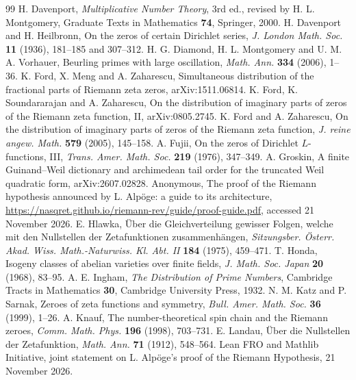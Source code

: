 \documentclass[11pt,a4paper]{article}
\theoremstyle{definition}\newtheorem{definition}[proposition]{Definition}
\theoremstyle{remark}\newtheorem{remark}[proposition]{Remark}
\begin{document}
\begin{thebibliography}{99}
 H. Davenport, \emph{Multiplicative Number Theory}, 3rd ed., revised by H. L. Montgomery, Graduate Texts in Mathematics \textbf{74}, Springer, 2000.
 H. Davenport and H. Heilbronn, On the zeros of certain Dirichlet series, \emph{J. London Math. Soc.} \textbf{11} (1936), 181--185 and 307--312.
 H. G. Diamond, H. L. Montgomery and U. M. A. Vorhauer, Beurling primes with large oscillation, \emph{Math. Ann.} \textbf{334} (2006), 1--36.
 K. Ford, X. Meng and A. Zaharescu, Simultaneous distribution of the fractional parts of Riemann zeta zeros, arXiv:1511.06814.
 K. Ford, K. Soundararajan and A. Zaharescu, On the distribution of imaginary parts of zeros of the Riemann zeta function, II, arXiv:0805.2745.
 K. Ford and A. Zaharescu, On the distribution of imaginary parts of zeros of the Riemann zeta function, \emph{J. reine angew. Math.} \textbf{579} (2005), 145--158.
 A. Fujii, On the zeros of Dirichlet $L$-functions, III, \emph{Trans. Amer. Math. Soc.} \textbf{219} (1976), 347--349.
 A. Groskin, A finite Guinand--Weil dictionary and archimedean tail order for the truncated Weil quadratic form, arXiv:2607.02828.
 Anonymous, The proof of the Riemann hypothesis announced by L. Alp\"oge: a guide to its architecture, \url{https://nasqret.github.io/riemann-rev/guide/proof-guide.pdf}, accessed 21 November 2026.
 E. Hlawka, \"Uber die Gleichverteilung gewisser Folgen, welche mit den Nullstellen der Zetafunktionen zusammenh\"angen, \emph{Sitzungsber. \"Osterr. Akad. Wiss. Math.-Naturwiss. Kl. Abt. II} \textbf{184} (1975), 459--471.
 T. Honda, Isogeny classes of abelian varieties over finite fields, \emph{J. Math. Soc. Japan} \textbf{20} (1968), 83--95.
 A. E. Ingham, \emph{The Distribution of Prime Numbers}, Cambridge Tracts in Mathematics \textbf{30}, Cambridge University Press, 1932.
 N. M. Katz and P. Sarnak, Zeroes of zeta functions and symmetry, \emph{Bull. Amer. Math. Soc.} \textbf{36} (1999), 1--26.
 A. Knauf, The number-theoretical spin chain and the Riemann zeroes, \emph{Comm. Math. Phys.} \textbf{196} (1998), 703--731.
 E. Landau, \"Uber die Nullstellen der Zetafunktion, \emph{Math. Ann.} \textbf{71} (1912), 548--564.
 Lean FRO and Mathlib Initiative, joint statement on L. Alp\"oge's proof of the Riemann Hypothesis, 21 November 2026.

\end{thebibliography}
\end{document}
